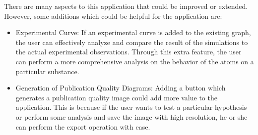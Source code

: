 There are many aspects to this application that could be improved or extended. However, some additions which could be helpful for the application are:

\begin{itemize}
	\item Experimental Curve: If an experimental curve is added to the existing graph, the user can effectively analyze and compare the result of the simulations to the actual experimental observations. Through this extra feature, the user can perform a more comprehensive analysis on the behavior of the atoms on a particular substance.

  \item Generation of Publication Quality Diagrams: Adding a button which generates a publication quality image could add more value to the application. This is because if the user wants to test a particular hypothesis or perform some analysis and save the image with high resolution, he or she can perform the export operation with ease. 

\end{itemize}